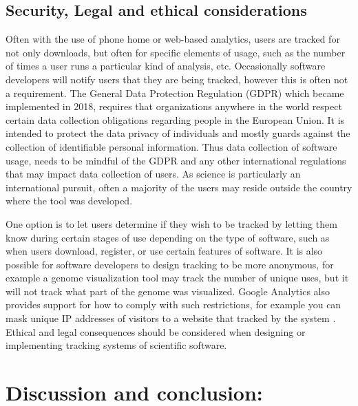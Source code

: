 \documentclass{article}
\begin{document}
\subsection{Security, Legal and ethical considerations}\label{sec:legal_ethics}
Often with the use of phone home or web-based analytics, users are tracked for not only downloads, but often for specific elements of usage, such as the number of times a user runs a particular kind of analysis, etc. Occasionally software developers will notify users that they are being tracked, however this is often not a requirement. The General Data Protection Regulation (GDPR) which became implemented in 2018, requires that organizations anywhere in the world respect certain data collection obligations regarding people in the European Union. It is intended to protect the data privacy of individuals and mostly guards against the collection of identifiable personal information. Thus data collection of software usage, needs to be mindful of the GDPR and any other international regulations that may impact data collection of users.  As science is particularly an international pursuit, often a majority of the users may reside outside the country where the tool was developed.

One option is to let users determine if they wish to be tracked by letting them know during certain stages of use depending on the type of software, such as when users download, register, or use certain features 
 of software. It is also possible for software developers to design tracking to be more anonymous, for example a genome visualization tool may track the number of unique uses, but it will not track what part of the genome was visualized. Google Analytics also provides support for how to comply with such restrictions, for example you can  mask unique IP addresses of visitors to a website that tracked by the system \cite{google_analytics_privacy}.  Ethical and legal consequences should be considered when designing or implementing tracking systems of scientific software. 



\section{Discussion and conclusion:}
\end{document}
